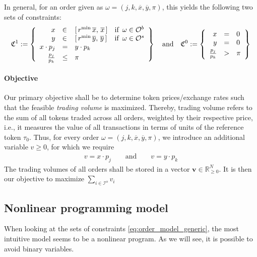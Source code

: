 \documentclass[11pt,parskip=full]{scrartcl}%
\newcommand*{\ie}{i.e., }
\newcommand*{\Min}{\mathrm{min}}
\newcommand*{\buyorders}{\mathcal{O}^b}     %
\newcommand*{\sellorders}{\mathcal{O}^s}    %
\newcommand*{\iorders}{\mathcal{I}^o}       %
\begin{document}
In general, for an order given as $ \omega = (j,k,\overline{x},\overline{y},\pi) $, this yields
the following two sets of constraints:
\begin{align}
  \mathfrak{C}^1 := \left\{
  \begin{array}{rlll}
    x &\in & [\, r^\Min \, \overline{x}, \, \overline{x}\,]
      &\text{if} \enskip \omega \in \buyorders\\
    y &\in & [\, r^\Min \, \overline{y}, \, \overline{y}\,]
      &\text{if} \enskip \omega \in \sellorders\\
    x \cdot p_j &= & y \cdot p_k \\[1mm]
    \frac{p_j}{p_k} &\le & \pi
  \end{array}
  \right\}
  \quad
  \text{and}
  \quad
  \mathfrak{C}^0 := \left\{
  \begin{array}{rll}
    x &= & 0 \\
    y &= & 0 \\[1mm]
    \frac{p_j}{p_k} &> & \pi
  \end{array}
  \right\}
  \label{eq:order_model_generic}
\end{align}

\paragraph{Objective}

Our primary objective shall be to determine token prices/exchange rates such that the feasible
\emph{trading volume} is maximized.
Thereby, trading volume refers to the sum of all tokens traded across all orders, weighted by their
respective price, \ie it measures the value of all transactions in terms of units of the reference
token $ \tau_0 $.
Thus, for every order $ \omega = (j,k,\overline{x},\overline{y},\pi) $, we introduce an additional
variable $ v \ge 0 $, for which we require
\begin{align}
  v = x \cdot p_j \qquad \text{and} \qquad v = y \cdot p_k
  \label{eq:trading_volume}
\end{align}
The trading volumes of all orders shall be stored in a vector
$ \mathbf{v} \in \mathbb{R}^N_{\ge 0} $.
It is then our objective to maximize $ \sum_{i \in \iorders} v_i $


\subsection{Nonlinear programming model}
\label{subsec:NLPmodel}

When looking at the sets of constraints \eqref{eq:order_model_generic}, the most intuitive model
seems to be a nonlinear program.
As we will see, it is possible to avoid binary variables.
\end{document}
